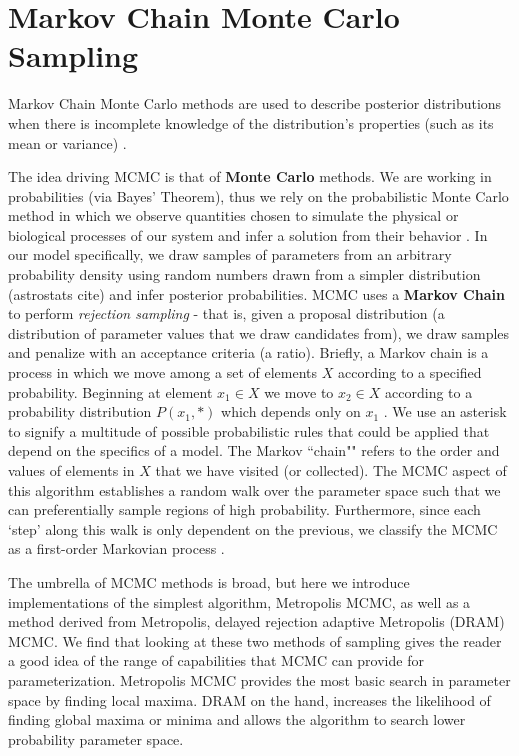 \documentclass{article}
\begin{document}
\section{Markov Chain Monte Carlo Sampling} \label{Markov_Chain_Monte_Carlo_Sampling}
Markov Chain Monte Carlo methods are used to describe posterior distributions when there is incomplete knowledge of the distribution's properties (such as its mean or variance) \cite{MLEvsBayes_powerpoint}. 
\par The idea driving MCMC is that of \textbf{Monte Carlo} methods. We are working in probabilities (via Bayes' Theorem), thus we rely on the probabilistic Monte Carlo method in which we observe quantities chosen to simulate the physical or biological processes of our system and infer a solution from their behavior \cite{montecarlo}. In our model specifically, we draw samples of parameters from an arbitrary probability density using random numbers drawn from a simpler distribution (astrostats cite) and infer posterior probabilities. MCMC uses a \textbf{Markov Chain} to perform \emph{rejection sampling} - that is, given a proposal distribution (a distribution of parameter values that we draw candidates from), we draw samples and penalize with an acceptance criteria (a ratio). Briefly, a Markov chain is a process in which we move among a set of elements $X$ according to a specified probability. Beginning at element $x_1 \in X$ we move to $x_2 \in X$ according to a probability distribution $P(x_1, *)$ which depends only on $x_1$ \cite{markovchains}. We use an asterisk to signify a multitude of possible probabilistic rules that could be applied that depend on the specifics of a model. The Markov ``chain"" refers to the order and values of elements in $X$ that we have visited (or collected).
The MCMC aspect of this algorithm establishes a random walk over the parameter space such that we can preferentially sample regions of high probability. Furthermore, since each `step' along this walk is only dependent on the previous, we classify the MCMC as a first-order Markovian process \cite{firstorderMarkovian}. 

\par The umbrella of MCMC methods is broad, but here we introduce implementations of the simplest algorithm, Metropolis MCMC, as well as a method derived from Metropolis, delayed rejection adaptive Metropolis (DRAM) MCMC. We find that looking at these two methods of sampling gives the reader a good idea of the range of capabilities that MCMC can provide for parameterization. Metropolis MCMC provides the most basic search in parameter space by finding local maxima. DRAM on the hand, increases the likelihood of finding global maxima or minima and allows the algorithm to search lower probability parameter space.
\end{document}
